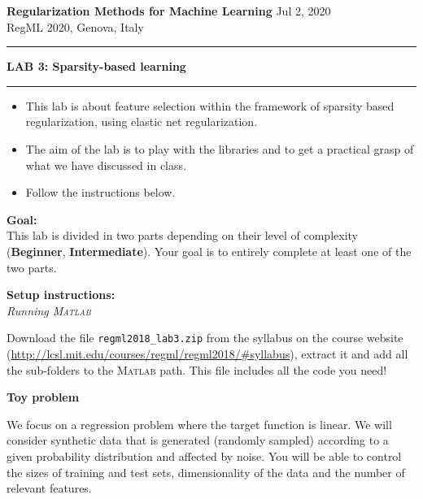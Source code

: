 \documentclass[DIN, pagenumber=false, fontsize=11pt, parskip=half]{scrartcl}
\newcommand{\MATLAB}{\textsc{Matlab}\xspace}
\newcommand{\mytitle}[1]{{\noindent\LARGE\textbf{#1}}}
\newcommand{\mysection}[1]{\noindent\large\textbf{#1}}
\begin{document}
\noindent\textbf{Regularization Methods for Machine Learning} \hfill Jul 2, 2020\\
RegML 2020, Genova, Italy \\ \rule{\textwidth}{1pt}

\mytitle{LAB 3: Sparsity-based learning}\\
\rule{\textwidth}{1pt}
\begin{itemize}\itemsep1pt \parskip0pt 
  \item This lab is about feature selection within the framework of sparsity based regularization, using elastic net regularization.
  \item The aim of the lab is to play with the libraries and to get a practical grasp of what we have discussed in class.
  \item Follow the instructions below.
\end{itemize}

\begin{framed}
\textbf{\textbf{Goal}:} \\
This lab is divided in two parts depending on their level of complexity (\textbf{Beginner}, \textbf{Intermediate}).
Your goal is to entirely complete at least one of the two parts.
\end{framed}

\begin{framed}
\textbf{\textbf{Setup instructions}:} \\
\textit{Running \MATLAB}

 Download the file \texttt{regml2018\_lab3.zip} from the syllabus on the course website (\url{http://lcsl.mit.edu/courses/regml/regml2018/\#syllabus}), extract it and add all the sub-folders to the \MATLAB path. This file includes all the code you need!
\end{framed}

\mysection{Toy problem}

We focus on a regression problem where the target function is linear.
We will consider synthetic data that is generated (randomly sampled) according to a given probability distribution and affected by noise.
You will be able to control the sizes of training and test sets, dimensionality of the data and the number of relevant features.
\end{document}
